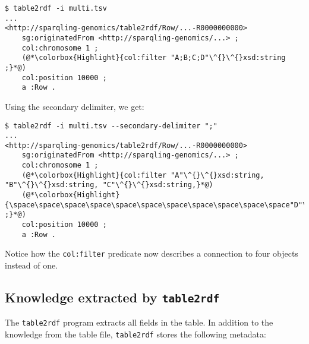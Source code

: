 \begin{siderules}
\begin{lstlisting}
$ table2rdf -i multi.tsv
...
<http://sparqling-genomics/table2rdf/Row/...-R0000000000>
    sg:originatedFrom <http://sparqling-genomics/...> ;
    col:chromosome 1 ;
    (@*\colorbox{Highlight}{col:filter "A;B;C;D"\^{}\^{}xsd:string ;}*@)
    col:position 10000 ;
    a :Row .
\end{lstlisting}
\end{siderules}

  Using the secondary delimiter, we get:

\begin{siderules}
\begin{lstlisting}
$ table2rdf -i multi.tsv --secondary-delimiter ";"
...
<http://sparqling-genomics/table2rdf/Row/...-R0000000000>
    sg:originatedFrom <http://sparqling-genomics/...> ;
    col:chromosome 1 ;
    (@*\colorbox{Highlight}{col:filter "A"\^{}\^{}xsd:string, "B"\^{}\^{}xsd:string, "C"\^{}\^{}xsd:string,}*@)
    (@*\colorbox{Highlight}{\space\space\space\space\space\space\space\space\space\space\space"D"\^{}\^{}xsd:string ;}*@)
    col:position 10000 ;
    a :Row .
\end{lstlisting}
\end{siderules}

  Notice how the \texttt{col:filter} predicate now describes a
  connection to four objects instead of one.

\subsection{Knowledge extracted by \texttt{table2rdf}}

  The \texttt{table2rdf} program extracts all fields in the table.  In addition
  to the knowledge from the table file, \texttt{table2rdf} stores the following
  metadata:

